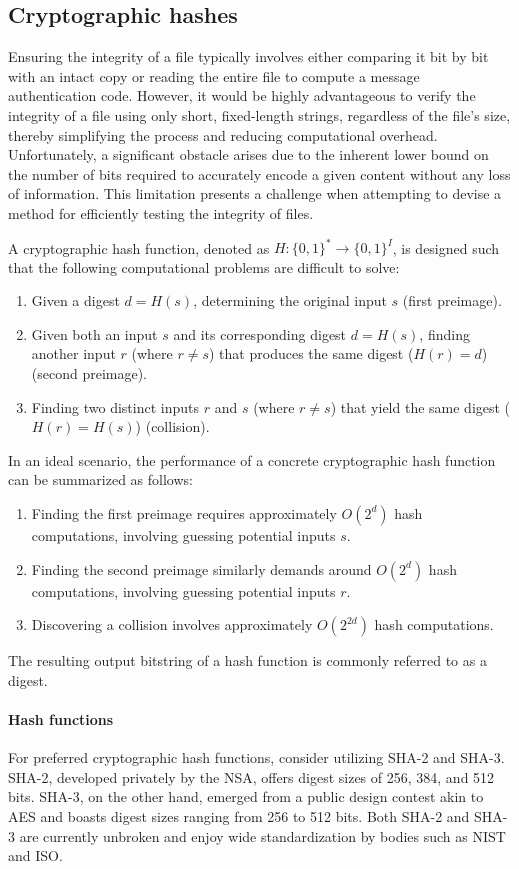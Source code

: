 \subsection{Cryptographic hashes}
Ensuring the integrity of a file typically involves either comparing it bit by bit with an intact copy or reading the entire file to compute a message authentication code.
However, it would be highly advantageous to verify the integrity of a file using only short, fixed-length strings, regardless of the file's size, thereby simplifying the process and reducing computational overhead.
Unfortunately, a significant obstacle arises due to the inherent lower bound on the number of bits required to accurately encode a given content without any loss of information. 
This limitation presents a challenge when attempting to devise a method for efficiently testing the integrity of files.

A cryptographic hash function, denoted as $H : \{0, 1\}^\ast \rightarrow \{0, 1\}^I$, is designed such that the following computational problems are difficult to solve:
\begin{enumerate}
    \item Given a digest $d = H(s)$, determining the original input $s$ (first preimage).
    \item Given both an input $s$ and its corresponding digest $d = H(s)$, finding another input $r$ (where $r \neq s$) that produces the same digest ($H(r) = d$) (second preimage).
    \item Finding two distinct inputs $r$ and $s$ (where $r \neq s$) that yield the same digest ($H(r) = H(s)$) (collision).
\end{enumerate}
In an ideal scenario, the performance of a concrete cryptographic hash function can be summarized as follows:
\begin{enumerate}
    \item Finding the first preimage requires approximately $O(2^d)$ hash computations, involving guessing potential inputs $s$.
    \item Finding the second preimage similarly demands around $O(2^d)$ hash computations, involving guessing potential inputs $r$.
    \item Discovering a collision involves approximately $O(2^{2d})$ hash computations.
\end{enumerate}
The resulting output bitstring of a hash function is commonly referred to as a digest.

\paragraph*{Hash functions}
For preferred cryptographic hash functions, consider utilizing SHA-2 and SHA-3. 
SHA-2, developed privately by the NSA, offers digest sizes of 256, 384, and 512 bits. 
SHA-3, on the other hand, emerged from a public design contest akin to AES and boasts digest sizes ranging from 256 to 512 bits. 
Both SHA-2 and SHA-3 are currently unbroken and enjoy wide standardization by bodies such as NIST and ISO.

